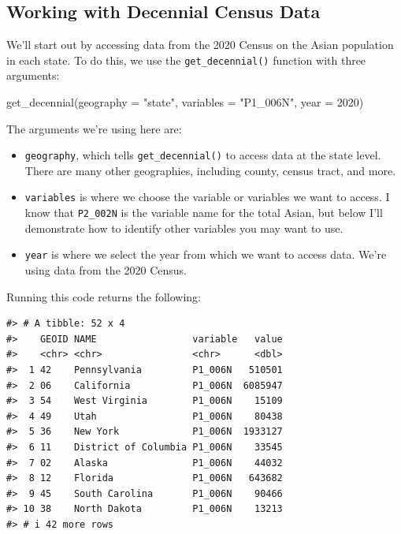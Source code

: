 \documentclass[
]{book}
\newenvironment{Shaded}{\begin{snugshade}}{\end{snugshade}}
\newcommand{\AttributeTok}[1]{\textcolor[rgb]{0.77,0.63,0.00}{#1}}
\newcommand{\DecValTok}[1]{\textcolor[rgb]{0.00,0.00,0.81}{#1}}
\newcommand{\FunctionTok}[1]{\textcolor[rgb]{0.00,0.00,0.00}{#1}}
\newcommand{\NormalTok}[1]{#1}
\newcommand{\StringTok}[1]{\textcolor[rgb]{0.31,0.60,0.02}{#1}}
\providecommand{\tightlist}{%
  \setlength{\itemsep}{0pt}\setlength{\parskip}{0pt}}
\begin{document}
\hypertarget{working-with-decennial-census-data}{%
\subsection*{Working with Decennial Census Data}\label{working-with-decennial-census-data}}

We'll start out by accessing data from the 2020 Census on the Asian population in each state. To do this, we use the \texttt{get\_decennial()} function with three arguments:

\begin{Shaded}
\begin{Highlighting}[]
\FunctionTok{get\_decennial}\NormalTok{(}\AttributeTok{geography =} \StringTok{"state"}\NormalTok{, }
              \AttributeTok{variables =} \StringTok{"P1\_006N"}\NormalTok{,}
              \AttributeTok{year =} \DecValTok{2020}\NormalTok{)}
\end{Highlighting}
\end{Shaded}

The arguments we're using here are:

\begin{itemize}
\tightlist
\item
  \texttt{geography}, which tells \texttt{get\_decennial()} to access data at the state level. There are many other geographies, including county, census tract, and more.
\item
  \texttt{variables} is where we choose the variable or variables we want to access. I know that \texttt{P2\_002N} is the variable name for the total Asian, but below I'll demonstrate how to identify other variables you may want to use.
\item
  \texttt{year} is where we select the year from which we want to access data. We're using data from the 2020 Census.
\end{itemize}

Running this code returns the following:

\begin{verbatim}
#> # A tibble: 52 x 4
#>    GEOID NAME                 variable   value
#>    <chr> <chr>                <chr>      <dbl>
#>  1 42    Pennsylvania         P1_006N   510501
#>  2 06    California           P1_006N  6085947
#>  3 54    West Virginia        P1_006N    15109
#>  4 49    Utah                 P1_006N    80438
#>  5 36    New York             P1_006N  1933127
#>  6 11    District of Columbia P1_006N    33545
#>  7 02    Alaska               P1_006N    44032
#>  8 12    Florida              P1_006N   643682
#>  9 45    South Carolina       P1_006N    90466
#> 10 38    North Dakota         P1_006N    13213
#> # i 42 more rows
\end{verbatim}
\end{document}

